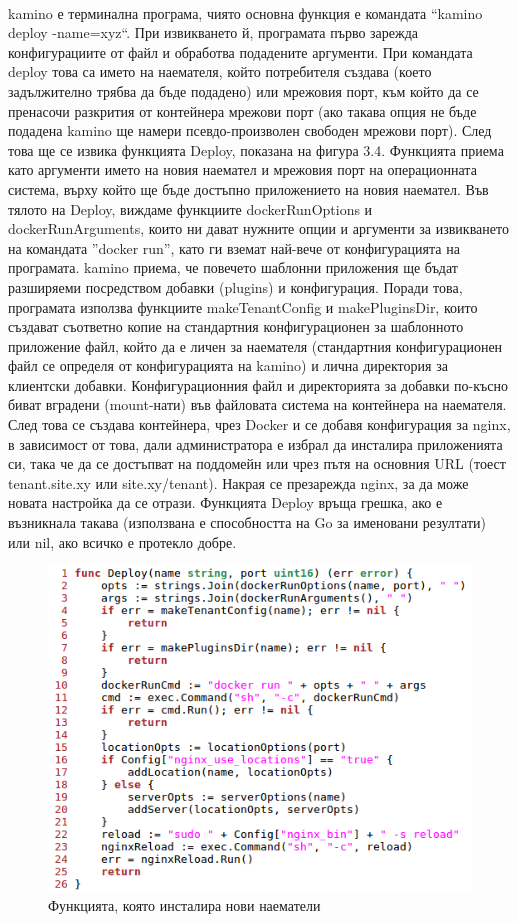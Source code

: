 \documentclass[pdftex,14pt,a4paper]{extreport}
\begin{document}
\paragraph {}
kamino е терминална програма, чиято основна функция е командата ``kamino deploy -name=xyz``. При извикването й, програмата първо зарежда конфигурациите от файл и обработва подадените аргументи. При командата deploy това са името на наемателя, който потребителя създава (което задължително трябва да бъде подадено) или мрежовия порт, към който да се пренасочи разкрития от контейнера мрежови порт (ако такава опция не бъде подадена kamino ще намери псевдо-произволен свободен мрежови порт). След това ще се извика функцията Deploy, показана на фигура 3.4. Функцията приема като аргументи името на новия наемател и мрежовия порт на операционната система, върху който ще бъде достъпно приложението на новия наемател. Във тялото на Deploy, виждаме функциите dockerRunOptions и dockerRunArguments, които ни дават нужните опции и аргументи за извикването на командата ''docker run'', като ги вземат най-вече от конфигурацията на програмата. kamino приема, че повечето шаблонни приложения ще бъдат разширяеми посредством добавки (plugins) и конфигурация. Поради това, програмата използва функциите makeTenantConfig и makePluginsDir, които създават съответно копие на стандартния конфигурационен за шаблонното приложение файл, който да е личен за наемателя (стандартния конфигурационен файл се определя от конфигурацията на kamino) и лична директория за клиентски добавки. Конфигурационния файл и директорията за добавки по-късно биват вградени (mount-нати) във файловата система на контейнера на наемателя. След това се създава контейнера, чрез Docker и се добавя конфигурация за nginx, в зависимост от това, дали администратора е избрал да инсталира приложенията си, така че да се достъпват на поддомейн или чрез пътя на основния URL (тоест tenant.site.xy или site.xy/tenant). Накрая се презарежда nginx, за да може новата настройка да се отрази. Функцията Deploy връща грешка, ако е възникнала такава (използвана е способността на Go за именовани резултати) или nil, ако всичко е протекло добре.
\begin{figure}[h]
  \centering
  \includegraphics[scale=0.8]{./snippets/kamino_deploy}
  \caption{Функцията, която инсталира нови наематели}
\end{figure}
\end{document}

